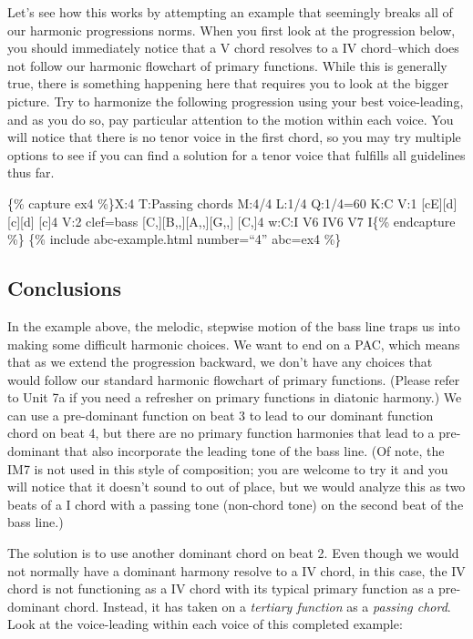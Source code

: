 \documentclass{book}
\begin{document}
Let's see how this works by attempting an example that seemingly breaks all of
our harmonic progressions norms. When you first look at the progression below,
you should immediately notice that a V chord resolves to a IV chord--which
does not follow our harmonic flowchart of primary functions. While this is
generally true, there is something happening here that requires you to look at
the bigger picture. Try to harmonize the following progression using your best
voice-leading, and as you do so, pay particular attention to the motion within
each voice. You will notice that there is no tenor voice in the first chord,
so you may try multiple options to see if you can find a solution for a tenor
voice that fulfills all guidelines thus far.

\{\% capture ex4 \%\}X:4 T:Passing chords M:4/4 L:1/4 Q:1/4=60 K:C V:1
{[}cE{]}{[}d{]}{[}c{]}{[}d{]}\textbar{} {[}c{]}4\textbar{]} V:2 clef=bass
{[}C,{]}{[}B,,{]}{[}A,,{]}{[}G,,{]}\textbar{} {[}C,{]}4\textbar{]} w:C:I V6
IV6 V7 I\{\% endcapture \%\} \{\% include abc-example.html number=``4''
abc=ex4 \%\}

\hypertarget{conclusions-65}{%
\subsection{Conclusions}\label{conclusions-65}}

In the example above, the melodic, stepwise motion of the bass line traps us
into making some difficult harmonic choices. We want to end on a PAC, which
means that as we extend the progression backward, we don't have any choices
that would follow our standard harmonic flowchart of primary functions.
(Please refer to Unit 7a if you need a refresher on primary functions in
diatonic harmony.) We can use a pre-dominant function on beat 3 to lead to our
dominant function chord on beat 4, but there are no primary function harmonies
that lead to a pre-dominant that also incorporate the leading tone of the bass
line. (Of note, the IM7 is not used in this style of composition; you are
welcome to try it and you will notice that it doesn't sound to out of place,
but we would analyze this as two beats of a I chord with a passing tone
(non-chord tone) on the second beat of the bass line.)

The solution is to use another dominant chord on beat 2. Even though we would
not normally have a dominant harmony resolve to a IV chord, in this case, the
IV chord is not functioning as a IV chord with its typical primary function as
a pre-dominant chord. Instead, it has taken on a \emph{tertiary function} as a
\emph{passing chord}. Look at the voice-leading within each voice of this
completed example:
\end{document}
